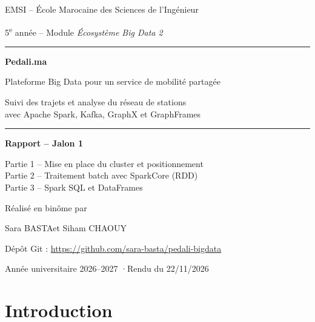 \documentclass[10pt,a4paper]{article}
\newcommand{\etudiantA}{Sara BASTA}
\newcommand{\etudiantB}{Siham CHAOUY}
\begin{document}
\begin{titlepage}
  \centering
  {\large EMSI -- École Marocaine des Sciences de l'Ingénieur\par}
  {\normalsize 5\textsuperscript{e} année -- Module \emph{Écosystème Big Data 2}\par}
  \vspace{3.2cm}
  {\color{accent}\rule{\linewidth}{1pt}\par}
  \vspace{0.5cm}
  {\Huge\bfseries Pedali.ma\par}
  \vspace{0.3cm}
  {\Large Plateforme Big Data pour un service de mobilité partagée\par}
  \vspace{0.4cm}
  {\large Suivi des trajets et analyse du réseau de stations\\
   avec Apache Spark, Kafka, GraphX et GraphFrames\par}
  \vspace{0.5cm}
  {\color{accent}\rule{\linewidth}{1pt}\par}
  \vspace{1.2cm}
  {\Large\bfseries Rapport -- Jalon 1\par}
  \vspace{0.2cm}
  {\large Partie 1 -- Mise en place du cluster et positionnement\\[1mm]
          Partie 2 -- Traitement batch avec SparkCore (RDD)\\[1mm]
          Partie 3 -- Spark SQL et DataFrames\par}
  \vfill
  {\large Réalisé en binôme par\par\vspace{0.2cm}
   {\Large \etudiantA \quad et \quad \etudiantB}\par}
  \vspace{1.2cm}
  {\normalsize Dépôt Git : \url{https://github.com/sara-basta/pedali-bigdata}\par}
  \vspace{0.3cm}
  {\normalsize Année universitaire 2026--2027 \quad·\quad Rendu du 22/11/2026\par}
\end{titlepage}


\section*{Introduction}
\end{document}
